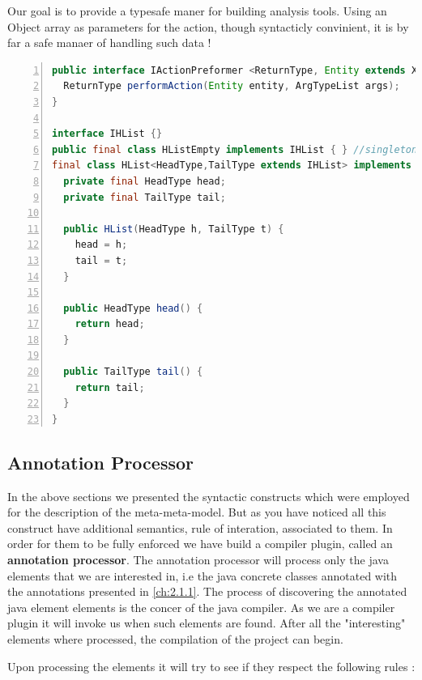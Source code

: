         Our goal is to provide a typesafe maner for building analysis tools. Using an Object array as parameters for the action, though syntacticly convinient, it is by far a safe manaer of handling 
such data !

\small
\begin{lstlisting}[language=Java, numbers=left]
public interface IActionPreformer <ReturnType, Entity extends XEntity, ArgTypeList extends IHList> {
  ReturnType performAction(Entity entity, ArgTypeList args);
}

interface IHList {}
public final class HListEmpty implements IHList { } //singleton element
final class HList<HeadType,TailType extends IHList> implements IHList {
  private final HeadType head;
  private final TailType tail;
            
  public HList(HeadType h, TailType t) {
    head = h;
    tail = t;
  }
    
  public HeadType head() {
    return head;
  }

  public TailType tail() {
    return tail;
  }
}
\end{lstlisting}
\normalsize{} \label{codeSelection:IActionPreformer}


\subsection{Annotation Processor}\label{ch:2.1.3}

        In the above sections we presented the syntactic constructs which were employed for the description of the meta-meta-model. But as you have noticed all this construct have additional
semantics, rule of interation, associated to them. In order for them to be fully enforced we have build a compiler plugin, called an \textbf{annotation processor}. The annotation processor
will process only the java elements that we are interested in, i.e the java concrete classes annotated with the annotations presented in \ref{ch:2.1.1}. The process of discovering the 
annotated java element elements is the concer of the java compiler. As we are a compiler plugin it will invoke us when such elements are found. After all the "interesting" elements 
where processed, the compilation of the project can begin.
        
        Upon processing the elements it will try to see if they respect the following rules \cite{oldThesis}:

